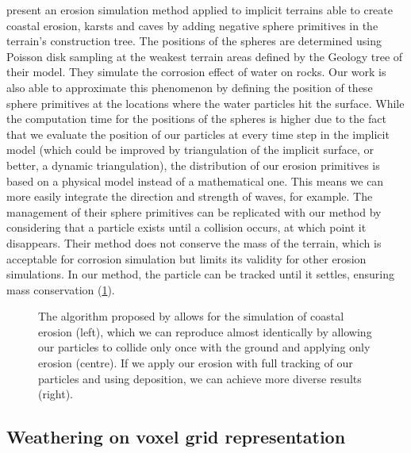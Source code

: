 \citep{Paris2019b} present an erosion simulation method applied to implicit terrains able to create coastal erosion, karsts and caves by adding negative sphere primitives in the terrain's construction tree. The positions of the spheres are determined using Poisson disk sampling at the weakest terrain areas defined by the Geology tree of their model. They simulate the corrosion effect of water on rocks. Our work is also able to approximate this phenomenon by defining the position of these sphere primitives at the locations where the water particles hit the surface. While the computation time for the positions of the spheres is higher due to the fact that we evaluate the position of our particles at every time step in the implicit model (which could be improved by triangulation of the implicit surface, or better, a dynamic triangulation), the distribution of our erosion primitives is based on a physical model instead of a mathematical one. This means we can more easily integrate the direction and strength of waves, for example. The management of their sphere primitives can be replicated with our method by considering that a particle exists until a collision occurs, at which point it disappears. Their method does not conserve the mass of the terrain, which is acceptable for corrosion simulation but limits its validity for other erosion simulations. In our method, the particle can be tracked until it settles, ensuring mass conservation (\cref{fig:erosion-screen-paris2019-1}).

\begin{figure}
    \caption{The algorithm proposed by \cite{Paris2019b} allows for the simulation of coastal erosion (left), which we can reproduce almost identically by allowing our particles to collide only once with the ground and applying only erosion (centre). If we apply our erosion with full tracking of our particles and using deposition, we can achieve more diverse results (right).}
    \label{fig:erosion-screen-paris2019-1}
\end{figure}

\subsection{Weathering on voxel grid representation}

